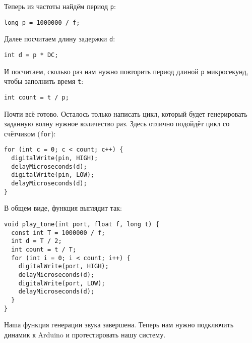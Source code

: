\documentclass[../sparc.tex]{subfiles}
\begin{document}
Теперь из частоты найдём период \texttt{p}:
\begin{verbatim}
long p = 1000000 / f;
\end{verbatim}

Далее посчитаем длину задержки \texttt{d}:
\begin{verbatim}
int d = p * DC;
\end{verbatim}

И посчитаем, сколько раз нам нужно повторить период длиной \texttt{p}
микросекунд, чтобы заполнить время \texttt{t}:
\begin{verbatim}
int count = t / p;
\end{verbatim}

Почти всё готово. Осталось только написать цикл, который будет генерировать
заданную волну нужное количество раз. Здесь отлично подойдёт цикл со счётчиком
(\texttt{for}):

\begin{verbatim}
for (int c = 0; c < count; c++) {
  digitalWrite(pin, HIGH);
  delayMicroseconds(d);
  digitalWrite(pin, LOW);
  delayMicroseconds(d);
}
\end{verbatim}

В общем виде, функция выглядит так:

\begin{verbatim}
void play_tone(int port, float f, long t) {
  const int T = 1000000 / f;
  int d = T / 2;
  int count = t / T;
  for (int i = 0; i < count; i++) {
    digitalWrite(port, HIGH);
    delayMicroseconds(d);
    digitalWrite(port, LOW);
    delayMicroseconds(d);
  }
}
\end{verbatim}

Наша функция генерации звука завершена. Теперь нам нужно подключить динамик к
Arduino и протестировать нашу систему.

\end{document}
